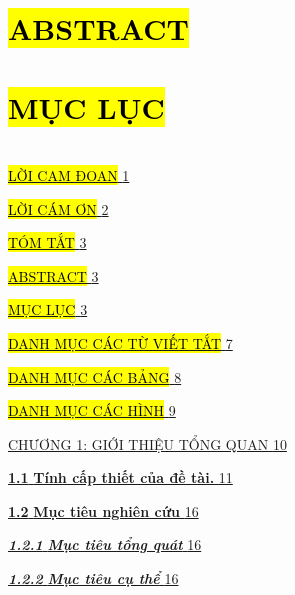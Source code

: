 \documentclass[
]{article}
\begin{document}
\section{\texorpdfstring{\hl{ABSTRACT}}{ABSTRACT}}\label{abstract}

\section{\texorpdfstring{\hl{MỤC
LỤC}}{MỤC LỤC}}\label{mux1ee5c-lux1ee5c}

\section{}\label{section}

\hyperref[lux1eddi-cam-ux111oan]{\hl{LỜI CAM ĐOAN}
\hyperref[lux1eddi-cam-ux111oan]{1}}

\hyperref[lux1eddi-cuxe1m-ux1a1n]{\hl{LỜI CÁM ƠN}
\hyperref[lux1eddi-cuxe1m-ux1a1n]{2}}

\hyperref[tuxf3m-tux1eaft]{\hl{TÓM TẮT} \hyperref[tuxf3m-tux1eaft]{3}}

\hyperref[abstract]{\hl{ABSTRACT} \hyperref[abstract]{3}}

\hyperref[mux1ee5c-lux1ee5c]{\hl{MỤC LỤC}
\hyperref[mux1ee5c-lux1ee5c]{3}}

\hyperref[danh-mux1ee5c-cuxe1c-tux1eeb-viux1ebft-tux1eaft]{\hl{DANH MỤC
CÁC TỪ VIẾT TẮT}
\hyperref[danh-mux1ee5c-cuxe1c-tux1eeb-viux1ebft-tux1eaft]{7}}

\hyperref[danh-mux1ee5c-cuxe1c-bux1ea3ng]{\hl{DANH MỤC CÁC BẢNG}
\hyperref[danh-mux1ee5c-cuxe1c-bux1ea3ng]{8}}

\hyperref[danh-mux1ee5c-cuxe1c-huxecnh]{\hl{DANH MỤC CÁC HÌNH}
\hyperref[danh-mux1ee5c-cuxe1c-huxecnh]{9}}

\hyperref[chux1b0ux1a1ng-1-giux1edbi-thiux1ec7u-tux1ed5ng-quan]{CHƯƠNG
1: GIỚI THIỆU TỔNG QUAN
\hyperref[chux1b0ux1a1ng-1-giux1edbi-thiux1ec7u-tux1ed5ng-quan]{10}}

\hyperref[_bookmark9]{\textbf{1.1} \textbf{Tính cấp thiết của đề tài.}
\hyperref[_bookmark9]{11}}

\hyperref[_Toc232111981]{\textbf{1.2} \textbf{Mục tiêu nghiên cứu}
\hyperref[_Toc232111981]{16}}

\hyperref[_Toc232111982]{\emph{\textbf{1.2.1}} \emph{\textbf{Mục tiêu
tổng quát}} \hyperref[_Toc232111982]{16}}

\hyperref[_Toc232111983]{\emph{\textbf{1.2.2}} \emph{\textbf{Mục tiêu cụ
thể}} \hyperref[_Toc232111983]{16}}
\end{document}
